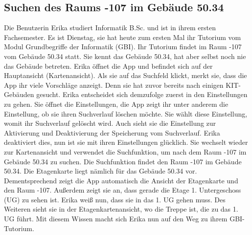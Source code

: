 \subsection{Suchen des Raums -107 im Gebäude 50.34}

Die Benutzerin Erika studiert Informatik B.Sc. und ist in ihrem ersten Fachsemester.
Es ist Dienstag, sie hat heute zum ersten Mal ihr Tutorium vom Modul Grundbegriffe der Informatik (GBI).
Ihr Tutorium findet im Raum -107 vom Gebäude 50.34 statt.
Sie kennt das Gebäude 50.34, hat aber selbst noch nie das Gebäude betreten.
Erika öffnet die App und befindet sich auf der Hauptansicht (\Gls{Kartenansicht}).
Als sie auf das Suchfeld klickt, merkt sie, dass die App ihr viele Vorschläge anzeigt.
Denn sie hat zuvor bereits nach einigen \Gls{KIT}-Gebäuden gesucht.
Erika entscheidet sich demzufolge zuerst in den Einstellungen zu gehen.
Sie öffnet die Einstellungen, die App zeigt ihr unter anderem die Einstellung, ob sie ihren Suchverlauf löschen möchte.
Sie wählt diese Einstellung, womit ihr Suchverlauf gelöscht wird.
Auch sieht sie die Einstellung zur Aktivierung und Deaktivierung der Speicherung vom Suchverlauf.
Erika deaktiviert dies, nun ist sie mit ihren Einstellungen glücklich.
Sie wechselt wieder zur \Gls{Kartenansicht} und verwendet die Suchfunktion, um nach dem Raum -107 im Gebäude 50.34 zu suchen.
Die Suchfunktion findet den Raum -107 im Gebäude 50.34.
Die \Gls{Etagenkarte} liegt nämlich für das Gebäude 50.34 vor.
Dementsprechend zeigt die App automatisch die Ansicht der \Gls{Etagenkarte} und den Raum -107.
Außerdem zeigt sie an, dass gerade die Etage 1. Untergeschoss (UG) zu sehen ist.
Erika weiß nun, dass sie in das 1. UG gehen muss.
Des Weiteren sieht sie in der \Gls{Etagenkartenansicht}, wo die Treppe ist, die zu das 1. UG führt.
Mit diesem Wissen macht sich Erika nun auf den Weg zu ihrem GBI-Tutorium.